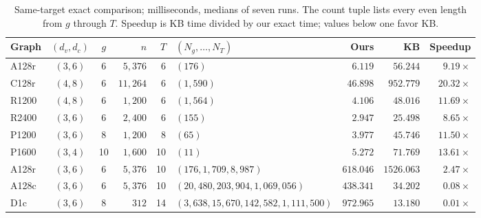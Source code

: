 \begin{table}[t]
\centering
\caption{Same-target exact comparison; milliseconds, medians of seven runs.
The count tuple lists every even length from $g$ through $T$.
Speedup is KB time divided by our exact time; values below one favor KB.}
\label{tab:exact-exp}
\footnotesize
\setlength{\tabcolsep}{5pt}
\begin{tabular}{lccrrlrrr}
\hline
Graph & $(d_v,d_c)$ & $g$ & $n$ & $T$ & $(N_g,\ldots,N_T)$ & Ours & KB & Speedup\\
\hline
A128r & $(3,6)$ & 6 & $5,376$ & 6 & $(176)$ & $6.119$ & $56.244$ & $9.19\times$\\
C128r & $(4,8)$ & 6 & $11,264$ & 6 & $(1,590)$ & $46.898$ & $952.779$ & $20.32\times$\\
R1200 & $(4,8)$ & 6 & $1,200$ & 6 & $(1,564)$ & $4.106$ & $48.016$ & $11.69\times$\\
R2400 & $(3,6)$ & 6 & $2,400$ & 6 & $(155)$ & $2.947$ & $25.498$ & $8.65\times$\\
P1200 & $(3,6)$ & 8 & $1,200$ & 8 & $(65)$ & $3.977$ & $45.746$ & $11.50\times$\\
P1600 & $(3,4)$ & 10 & $1,600$ & 10 & $(11)$ & $5.272$ & $71.769$ & $13.61\times$\\
A128r & $(3,6)$ & 6 & $5,376$ & 10 & $(176, 1,709, 8,987)$ & $618.046$ & $1526.063$ & $2.47\times$\\
A128c & $(3,6)$ & 6 & $5,376$ & 10 & $(20,480, 203,904, 1,069,056)$ & $438.341$ & $34.202$ & $0.08\times$\\
D1c & $(3,6)$ & 8 & $312$ & 14 & $(3,638, 15,670, 142,582, 1,111,500)$ & $972.965$ & $13.180$ & $0.01\times$\\
\hline
\end{tabular}
\end{table}

